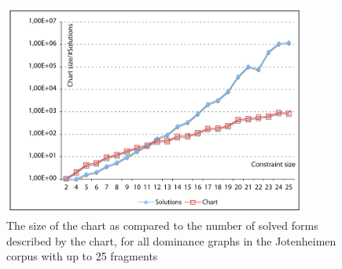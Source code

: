 \begin{figure}
\centering
\includegraphics[width=10cm]{chart-vs-solutions}
\caption{The size of the chart as compared to the number of solved forms described by the chart, for all dominance graphs in the Jotenheimen corpus with up to 25 fragments}

\end{figure}






